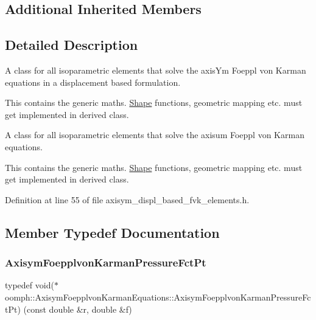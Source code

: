 \subsection*{Additional Inherited Members}


\subsection{Detailed Description}
A class for all isoparametric elements that solve the axis\+Ym Foeppl von Karman equations in a displacement based formulation.

This contains the generic maths. \hyperlink{classoomph_1_1Shape}{Shape} functions, geometric mapping etc. must get implemented in derived class.

A class for all isoparametric elements that solve the axisum Foeppl von Karman equations.

This contains the generic maths. \hyperlink{classoomph_1_1Shape}{Shape} functions, geometric mapping etc. must get implemented in derived class. 

Definition at line 55 of file axisym\+\_\+displ\+\_\+based\+\_\+fvk\+\_\+elements.\+h.



\subsection{Member Typedef Documentation}
\mbox{\label{classoomph_1_1AxisymFoepplvonKarmanEquations_a504878b18d793ef8a6540eb0f2b086c8}} 
\subsubsection{\texorpdfstring{Axisym\+Foepplvon\+Karman\+Pressure\+Fct\+Pt}{AxisymFoepplvonKarmanPressureFctPt}\hspace{0.1cm}{\footnotesize\ttfamily [1/2]}}
{\footnotesize\ttfamily typedef void($\ast$ oomph\+::\+Axisym\+Foepplvon\+Karman\+Equations\+::\+Axisym\+Foepplvon\+Karman\+Pressure\+Fct\+Pt) (const double \&r, double \&f)}



